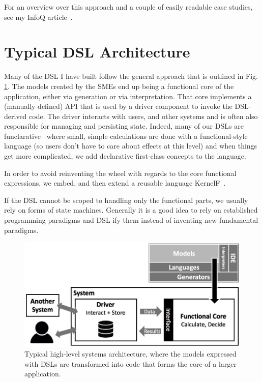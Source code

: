 \documentclass[runningheads]{llncs}
\newcommand{\fig}[1]{Fig. \ref{#1}}  %
\begin{document}
\vspace{3mm}

\noindent For an overview over this approach and a couple of easily readable 
case studies, see my InfoQ article~\cite{infoq}.


\section{Typical DSL Architecture}

Many of the DSL I have built follow the general approach that is outlined in
\fig{arch}. The models created by the SMEs end up being a functional core of the
application, either via generation or via interpretation.
That core implements a (manually defined) API that is used by a driver component
to invoke the DSL-derived code. The driver interacts with users, and other
systems and is often also responsible for managing and persisting state. Indeed,
many of our DSLs are funclarative~\cite{voelter2018fusing} where small, simple
calculations are done with a functional-style language (so users don't have to
care about effects at this level) and when things get more complicated, we add
declarative first-class concepts to the language.

In order to avoid reinventing the wheel with regards to the core functional
expressions, we embed, and then extend a reusable language
KernelF~\cite{volter2018design}.

If the DSL cannot be scoped to handling only the functional parts, we usually
rely on forms of state machines. Generally it is a good idea to rely on
established programming paradigms and DSL-ify them instead of inventing new
fundamental paradigms.



\begin{figure}[t]
\begin{center}
    \includegraphics[width=1\columnwidth]{figures/arch.png}
    \caption{Typical high-level systems architecture, where the models
    expressed with DSLs are transformed into code that forms the core
    of a larger application.}
    \label{arch}
\end{center} 
\end{figure} 
\end{document}
